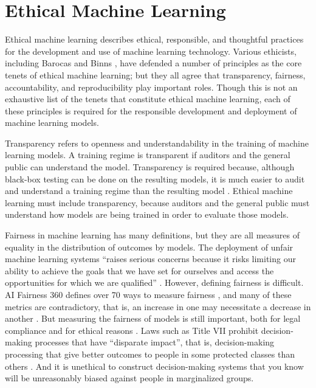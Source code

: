 \documentclass[letterpaper]{article}
\newcommand{\citep}[1]{\cite{#1}}
\begin{document}
\section{Ethical Machine Learning}
Ethical machine learning describes ethical, responsible, and thoughtful practices for the development and use of machine learning technology. Various ethicists, including Barocas  and Binns , have defended a number of principles as the core tenets of ethical machine learning; but they all agree that transparency, fairness, accountability, and reproducibility play important roles. Though this is not an exhaustive list of the tenets that constitute ethical machine learning, each of these principles is required for the responsible development and deployment of machine learning models.

Transparency refers to openness and understandability in the training of machine learning models. A training regime is transparent if auditors and the general public can understand the model. Transparency is required because, although black-box testing can be done on the resulting models, it is much easier to audit and understand a training regime than the resulting model \citep{DeLaat2018}. Ethical machine learning must include transparency, because auditors and the general public must understand how models are being trained in order to evaluate those models.

Fairness in machine learning has many definitions, but they are all measures of equality in the distribution of outcomes by models. The deployment of unfair machine learning systems ``raises serious concerns because it risks limiting our ability to achieve the goals that we have set for ourselves and access the opportunities for which we are qualified'' \citep{Barocas2019}. However, defining fairness is difficult. AI Fairness 360 defines over 70 ways to measure fairness \citep{Bellamy2018}, and many of these metrics are contradictory, that is, an increase in one may necessitate a decrease in another \citep{Kleinberg2016}. But measuring the fairness of models is still important, both for legal compliance \citep{Barocas2016} and for ethical reasons \citep{Binns2018}. Laws such as Title VII prohibit decision-making processes that have ``disparate impact'', that is, decision-making processing that give better outcomes to people in some protected classes than others \citep{Barocas2016}. And it is unethical to construct decision-making systems that you know will be unreasonably biased against people in marginalized groups.
\end{document}
